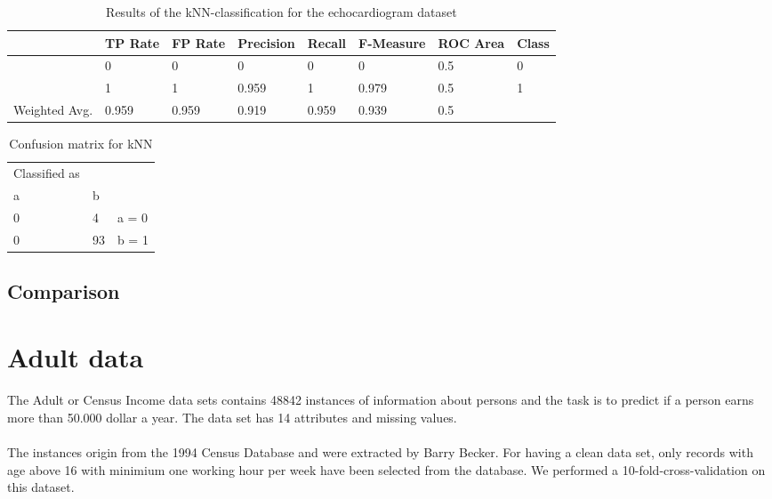 \documentclass[paper=a4, fontsize=11pt]{scrartcl} %
\numberwithin{equation}{section} %
\numberwithin{figure}{section} %
\numberwithin{table}{section} %
\begin{document}
\begin{table}[h]
\centering
\begin{tabular}{|llllllll|}
	\hline
									&TP Rate   	&FP Rate   &Precision &Recall  &F-Measure   &ROC Area  &Class\\
	\hline
									&0         	&0         &0         &0       &  0         & 0.5      &0\\
  								&1         	&1         &0.959     &1       &0.979       &	0.5      &1\\
  \hline
	Weighted Avg.		&0.959     	&0.959     &0.919   	&0.959   &0.939     	&0.5				&\\
	\hline
\end{tabular}
\caption{Results of the kNN-classification for the echocardiogram dataset}
\end{table}

\vspace{6pt}

\begin{table}[h]
\centering
\begin{tabular}{|lll|}
	\hline
	Classified as	& &\\
	a		&	b & \\
	\hline
	0   & 4  	&  a = 0\\
  0   & 93 	&  b = 1\\
  \hline
\end{tabular}
\caption{Confusion matrix for kNN}
\end{table}

\subsection{Comparison}

\section{Adult data}

\paragraph{}The Adult or Census Income data sets contains 48842 instances of information about persons and the task is to predict if a person earns more than 50.000 dollar a year. The data set has 14 attributes and missing values.

\paragraph{}The instances origin from the 1994 Census Database and were extracted by Barry Becker. For having a clean data set, only records with age above 16 with minimium one working hour per week have been selected from the database. We performed a 10-fold-cross-validation on this dataset.
\end{document}
